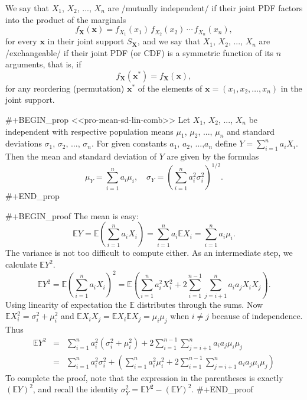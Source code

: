 We say that \(X_{1}\), \(X_{2}\), ..., \(X_{n}\) are /mutually
independent/ if their joint PDF factors into the product of the
marginals
\begin{equation}
f_{\mathbf{X}}(\mathbf{x})=f_{X_{1}}(x_{1})\, f_{X_{2}}(x_{2})\,\cdots\, f_{X_{n}}(x_{n}),
\end{equation}
for every \(\mathbf{x}\) in their joint support \(S_{\mathbf{X}}\),
and we say that \(X_{1}\), \(X_{2}\), ..., \(X_{n}\) are
/exchangeable/ if their joint PDF (or CDF) is a symmetric function of
its \(n\) arguments, that is, if
\begin{equation}
f_{\mathbf{X}}(\mathbf{x^{\ast}})=f_{\mathbf{X}}(\mathbf{x}),
\end{equation}
for any reordering (permutation) \(\mathbf{x^{\ast}}\) of the elements of \(\mathbf{x}=(x_{1},x_{2},\ldots,x_{n})\) in the joint support.

#+BEGIN_prop
<<pro-mean-sd-lin-comb>> Let \(X_{1}\), \(X_{2}\), ..., \(X_{n}\) be
independent with respective population means \(\mu_{1}\), \(\mu_{2}\),
..., \(\mu_{n}\) and standard deviations \(\sigma_{1}\),
\(\sigma_{2}\), ..., \(\sigma_{n}\). For given constants \(a_{1}\),
\(a_{2}\), ...,\(a_{n}\) define \(Y=\sum_{i=1}^{n}a_{i}X_{i}\). Then
the mean and standard deviation of \(Y\) are given by the formulas
\begin{equation}
\mu_{Y}=\sum_{i=1}^{n}a_{i}\mu_{i},\quad \sigma_{Y}=\left(\sum_{i=1}^{n}a_{i}^{2}\sigma_{i}^{2}\right)^{1/2}.
\end{equation}
#+END_prop

#+BEGIN_proof
The mean is easy: \[ \mathbb{E}
Y=\mathbb{E}\left(\sum_{i=1}^{n}a_{i}X_{i}\right)=\sum_{i=1}^{n}a_{i}\mathbb{E}
X_{i}=\sum_{i=1}^{n}a_{i}\mu_{i}.  \] The variance is not too
difficult to compute either. As an intermediate step, we calculate
\(\mathbb{E} Y^{2}\).  \[ \mathbb{E}
Y^{2}=\mathbb{E}\left(\sum_{i=1}^{n}a_{i}X_{i}\right)^{2}=\mathbb{E}\left(\sum_{i=1}^{n}a_{i}^{2}X_{i}^{2}+2\sum_{i=1}^{n-1}\sum_{j=i+1}^{n}a_{i}a_{j}X_{i}X_{j}\right).
\] Using linearity of expectation the \(\mathbb{E}\) distributes
through the sums. Now \(\mathbb{E}
X_{i}^{2}=\sigma_{i}^{2}+\mu_{i}^{2}\) and \(\mathbb{E}
X_{i}X_{j}=\mathbb{E} X_{i}\mathbb{E} X_{j}=\mu_{i}\mu_{j}\) when
\(i\neq j\) because of independence. Thus
\begin{eqnarray*}
\mathbb{E} Y^{2} & = & \sum_{i=1}^{n}a_{i}^{2}(\sigma_{i}^{2}+\mu_{i}^{2})+2\sum_{i=1}^{n-1}\sum_{j=i+1}^{n}a_{i}a_{j}\mu_{i}\mu_{j}\\
 & = & \sum_{i=1}^{n}a_{i}^{2}\sigma_{i}^{2}+\left(\sum_{i=1}^{n}a_{i}^{2}\mu_{i}^{2}+2\sum_{i=1}^{n-1}\sum_{j=i+1}^{n}a_{i}a_{j}\mu_{i}\mu_{j}\right)
\end{eqnarray*}
To complete the proof, note that the expression in the parentheses is
exactly \(\left(\mathbb{E} Y\right)^{2}\), and recall the identity
\(\sigma_{Y}^{2}=\mathbb{E} Y^{2}-\left(\mathbb{E} Y\right)^{2}\).
#+END_proof

